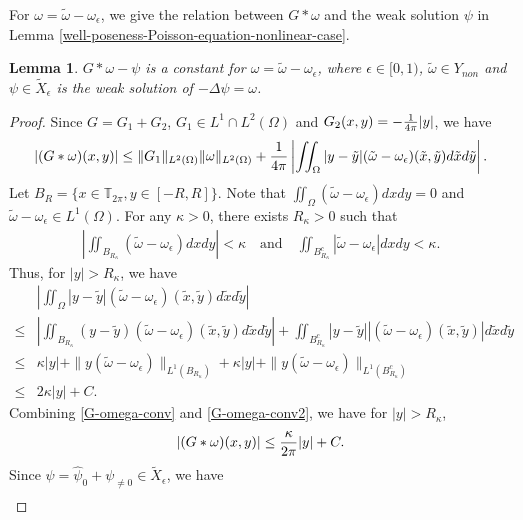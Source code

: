 \documentclass[1 [leqno, 11pt]{amsart}
\numberwithin{equation}{section}
\let\ep=\epsilon
\newtheorem{lemma}[Theorem]{Lemma}
\begin{document}
\begin{CJK*}{GBK}{song}
For $\omega=\tilde \omega-\omega_{\ep}$, we give the relation between $G\ast\omega$ and the weak solution $\psi$  in Lemma \ref{well-poseness-Poisson-equation-nonlinear-case}.
\begin{lemma}\label{G-ast-omega-psi-constant}
$G\ast\omega-\psi$ is a constant for $\omega=\tilde \omega-\omega_{\ep}$, where $\ep\in[0,1)$, $\tilde \omega\in Y_{non}$ and $\psi\in\tilde{X}_\ep$ is the weak solution of $-\Delta \psi = \omega$.
\end{lemma}
\begin{proof}
Since $G=G_1+G_2$, $G_1\in L^1\cap L^2(\Omega)$ and $G_2(x,y)=-{1\over4\pi} |y|$, we have
\begin{align}\label{G-omega-conv}
|(G\ast\omega)(x, y)|\leq \|G_1\|_{L^2(\Omega)}\|\omega\|_{L^2(\Omega)}+{1\over4\pi}\left|\iint_{\Omega}|y-\tilde y|(\tilde\omega-\omega_{\ep})(\tilde x,\tilde y)d\tilde xd\tilde y\right|.
\end{align}
Let $B_R=\{x\in\mathbb{T}_{2\pi},y\in[-R,R]\}$. Note that $\iint_{\Omega}(\tilde \omega-\omega_{\ep})dxdy=0$ and $\tilde \omega-\omega_{\ep}\in L^1(\Omega)$. For any $\kappa>0$, there exists $R_{\kappa}>0$ such that
\begin{align*}
\left|\iint_{B_{R_\kappa}}(\tilde\omega-\omega_{\ep})dxdy\right|<\kappa\quad\text{and}\quad
\iint_{B_{R_\kappa}^c}|\tilde\omega-\omega_{\ep}|dxdy<\kappa.
\end{align*}
Thus, for $| y|>R_{\kappa}$, we have
\begin{align}\nonumber
&\left|\iint_{\Omega}|y-\tilde y|(\tilde\omega-\omega_{\ep})(\tilde x,\tilde y)d\tilde xd\tilde y\right|\\\nonumber
\leq&\left|\iint_{B_{R_\kappa}}(y-\tilde y)(\tilde\omega-\omega_{\ep})(\tilde x,\tilde y)d\tilde xd\tilde y\right|+\iint_{B_{R_\kappa}^c}|y-\tilde y||(\tilde\omega-\omega_{\ep})(\tilde x,\tilde y)|d\tilde xd\tilde y\\\nonumber
\leq &\kappa| y|+\|y(\tilde\omega-\omega_{\ep})\|_{L^1(B_{R_\kappa})} +\kappa| y|+\|y(\tilde\omega-\omega_{\ep})\|_{L^1(B_{R_\kappa}^c)}\\\label{G-omega-conv2}
\leq &2\kappa | y|+C.
\end{align}
Combining \eqref{G-omega-conv} and \eqref{G-omega-conv2}, we have for $| y|>R_{\kappa}$,
\begin{align}\label{G-omega-conv-sum}
|(G\ast\omega)( x, y)|\leq {\kappa\over2\pi} | y|+C.
\end{align}
Since $\psi=\widehat\psi_0+\psi_{\neq0}\in \tilde X_{\ep}$, we have
\begin{align}\label{widehat-psi-property}

\end{align}
\end{proof}
\end{CJK*}
\end{document}
